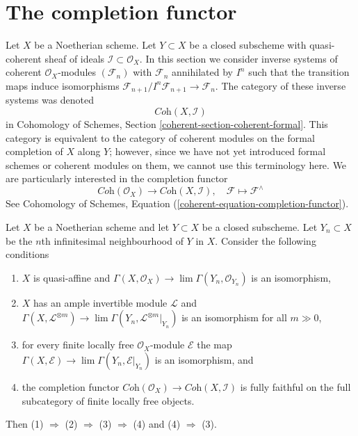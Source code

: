 \section{The completion functor}
\label{section-completion}

\noindent
Let $X$ be a Noetherian scheme. Let $Y \subset X$ be a closed subscheme
with quasi-coherent sheaf of ideals $\mathcal{I} \subset \mathcal{O}_X$.
In this section we consider inverse systems of coherent
$\mathcal{O}_X$-modules $(\mathcal{F}_n)$ with $\mathcal{F}_n$
annihilated by $I^n$ such that the transition maps induce
isomorphisms $\mathcal{F}_{n + 1}/I^n\mathcal{F}_{n + 1} \to \mathcal{F}_n$.
The category of these inverse systems was denoted
$$
\textit{Coh}(X, \mathcal{I})
$$
in Cohomology of Schemes, Section \ref{coherent-section-coherent-formal}.
This category is equivalent to the category of coherent modules
on the formal completion of $X$ along $Y$; however, since we have
not yet introduced formal schemes or coherent modules on them,
we cannot use this terminology here. We are particularly interested
in the completion functor
$$
\textit{Coh}(\mathcal{O}_X)
\longrightarrow
\textit{Coh}(X, \mathcal{I}),\quad
\mathcal{F} \longmapsto \mathcal{F}^\wedge
$$
See
Cohomology of Schemes, Equation (\ref{coherent-equation-completion-functor}).

\begin{lemma}
\label{lemma-completion-fully-faithful}
Let $X$ be a Noetherian scheme and let $Y \subset X$ be a closed subscheme.
Let $Y_n \subset X$ be the $n$th infinitesimal neighbourhood of $Y$ in $X$.
Consider the following conditions
\begin{enumerate}
\item $X$ is quasi-affine and
$\Gamma(X, \mathcal{O}_X) \to \lim \Gamma(Y_n, \mathcal{O}_{Y_n})$
is an isomorphism,
\item $X$ has an ample invertible module $\mathcal{L}$ and
$\Gamma(X, \mathcal{L}^{\otimes m}) \to
\lim \Gamma(Y_n, \mathcal{L}^{\otimes m}|_{Y_n})$
is an isomorphism for all $m \gg 0$,
\item for every finite locally free $\mathcal{O}_X$-module
$\mathcal{E}$ the map
$\Gamma(X, \mathcal{E}) \to \lim \Gamma(Y_n, \mathcal{E}|_{Y_n})$
is an isomorphism, and
\item the completion functor
$\textit{Coh}(\mathcal{O}_X) \to \textit{Coh}(X, \mathcal{I})$
is fully faithful on the full subcategory of finite locally free
objects.
\end{enumerate}
Then (1) $\Rightarrow$ (2) $\Rightarrow$ (3) $\Rightarrow$ (4)
and (4) $\Rightarrow$ (3).
\end{lemma}

